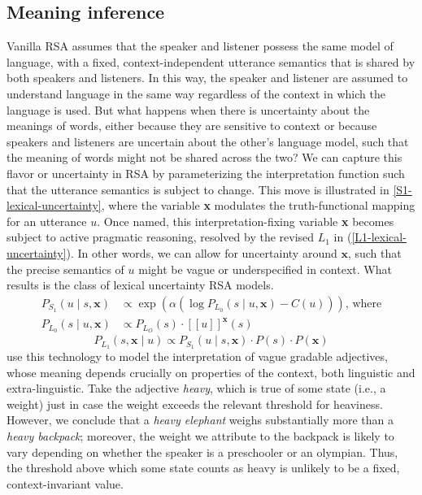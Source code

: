 \documentclass{sp}
\newcommand{\mf}[1]{\textcolor{orange}{[mf: #1]}}
\newcommand{\mht}[1]{\textcolor{purple}{[mht: #1]}}
\newcommand{\sem}[1]{\ensuremath{[\![#1]\!]}}
\begin{document}
\subsection{Meaning inference} \label{meaning-inference}

Vanilla RSA assumes that the speaker and listener possess the same model of language, with a fixed, context-independent utterance semantics that is shared by both speakers and listeners. In this way, the speaker and listener are assumed to understand language in the same way regardless of the context in which the language is used. But what happens when there is uncertainty about the meanings of words, either because they are sensitive to context or because speakers and listeners are uncertain about the other's language model, such that the meaning of words might not be shared across the two? We can capture this flavor or uncertainty in RSA by parameterizing the interpretation function such that the utterance semantics is subject to change. This move is illustrated in \eqref{S1-lexical-uncertainty}, where the variable \textbf{x} modulates the truth-functional mapping for an utterance $u$. Once named, this interpretation-fixing variable \textbf{x} becomes subject to active pragmatic reasoning, resolved by the revised $L_1$ in (\ref{L1-lexical-uncertainty}). In other words, we can allow for uncertainty around $\textbf{x}$, such that the precise semantics of $u$ might be vague or underspecified in context. What results is the class of lexical uncertainty RSA models. %
\begin{align} \label{S1-lexical-uncertainty}
P_{S_1}(u\mid s, \textbf{x}) & \propto \exp (\alpha (\log P_{L_0}(s\mid u, \textbf{x}) - C(u))) \text{, where} \\
  P_{L_0}(s \mid u, \textbf{x}) & \propto P_{L_O}(s)  \cdot \sem{u}^{\textbf{x}}(s) \nonumber
\end{align}
\begin{equation} \label{L1-lexical-uncertainty}
P_{L_1}(s, \textbf{x} \mid u) \propto P_{S_1}(u \mid s, \textbf{x}) \cdot P(s) \cdot P(\textbf{x})
\end{equation}
\cite{lassitergoodman2013} use this technology to model the interpretation of vague gradable adjectives, whose meaning depends crucially on properties of the context, both linguistic and extra-linguistic. Take the adjective \emph{heavy}, which is true of some state (i.e., a weight) just in case the weight exceeds the relevant threshold for heaviness. However, we conclude that a \emph{heavy elephant} weighs substantially more than a \emph{heavy backpack}; moreover, the weight we attribute to the backpack is likely to vary depending on whether the speaker is a preschooler or an olympian. Thus, the threshold above which some state counts as heavy is unlikely to be a fixed, context-invariant value.
\end{document}

